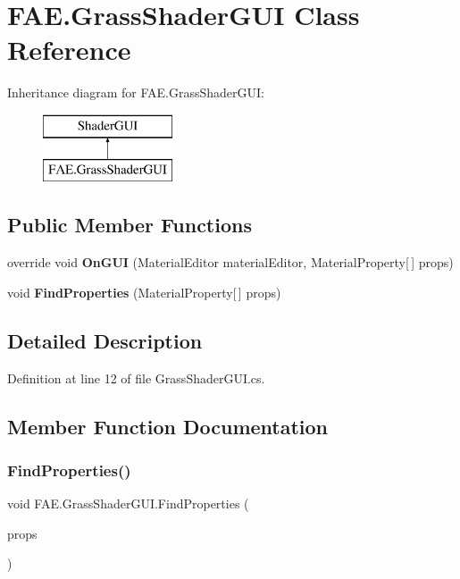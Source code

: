 \section{F\+A\+E.\+Grass\+Shader\+G\+UI Class Reference}
\label{class_f_a_e_1_1_grass_shader_g_u_i}
Inheritance diagram for F\+A\+E.\+Grass\+Shader\+G\+UI\+:\begin{figure}[H]
\begin{center}
\leavevmode
\includegraphics[height=2.000000cm]{class_f_a_e_1_1_grass_shader_g_u_i}
\end{center}
\end{figure}
\subsection*{Public Member Functions}
\begin{DoxyCompactItemize}
\item 
override void \textbf{ On\+G\+UI} (Material\+Editor material\+Editor, Material\+Property[$\,$] props)
\item 
void \textbf{ Find\+Properties} (Material\+Property[$\,$] props)
\end{DoxyCompactItemize}


\subsection{Detailed Description}


Definition at line 12 of file Grass\+Shader\+G\+U\+I.\+cs.



\subsection{Member Function Documentation}
\mbox{\label{class_f_a_e_1_1_grass_shader_g_u_i_a18f1e2bc5e957fd03e4ad41197964160}} 
\subsubsection{Find\+Properties()}
{\footnotesize\ttfamily void F\+A\+E.\+Grass\+Shader\+G\+U\+I.\+Find\+Properties (\begin{DoxyParamCaption}\item[{Material\+Property [$\,$]}]{props }\end{DoxyParamCaption})}



